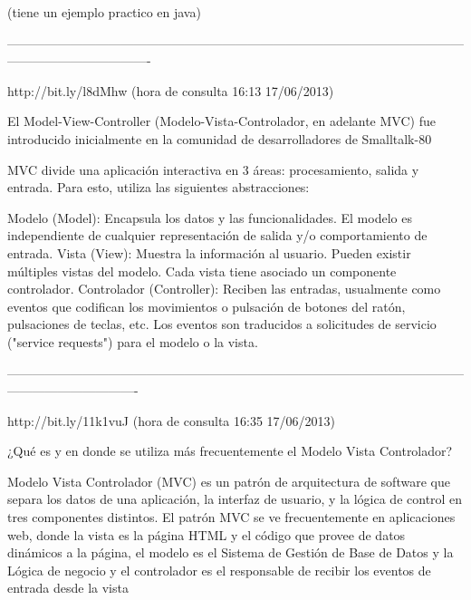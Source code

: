(tiene un ejemplo practico en java)

----------------------------------------------------------------------------------------------------------------------------------------------

http://bit.ly/l8dMhw (hora de consulta 16:13 17/06/2013)


El Model-View-Controller (Modelo-Vista-Controlador, en adelante MVC) fue introducido inicialmente en la comunidad de desarrolladores
de Smalltalk-80


MVC divide una aplicación interactiva en 3 áreas: procesamiento, salida y entrada. Para esto, utiliza las siguientes abstracciones:

    Modelo (Model): Encapsula los datos y las funcionalidades. El modelo es independiente de cualquier representación de salida y/o 
     comportamiento de entrada.
    Vista (View): Muestra la información al usuario. Pueden existir múltiples vistas del modelo. Cada vista tiene asociado un componente 
     controlador.
    Controlador (Controller): Reciben las entradas, usualmente como eventos que codifican los movimientos o pulsación de botones del 
     ratón, pulsaciones de teclas, etc. Los eventos son traducidos a solicitudes de servicio ("service requests") para el modelo o la vista.

-------------------------------------------------------------------------------------------------------------------------------------------


http://bit.ly/11k1vuJ (hora de consulta 16:35 17/06/2013)

¿Qué es y en donde se utiliza más frecuentemente el Modelo Vista Controlador?

Modelo Vista Controlador (MVC) es un patrón de arquitectura de software que separa los datos de una aplicación, la interfaz de usuario, 
y la lógica de control en tres componentes distintos. El patrón MVC se ve frecuentemente en aplicaciones web, donde la vista es la 
página HTML y el código que provee de datos dinámicos a la página, el modelo es el Sistema de Gestión de Base de Datos y la Lógica de 
negocio y el controlador es el responsable de recibir los eventos de entrada desde la vista

